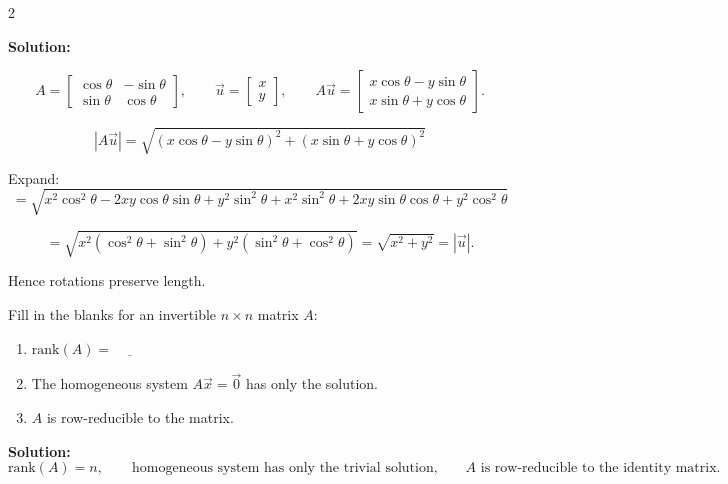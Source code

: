 \documentclass[8pt]{extarticle}
\begin{document}
\begin{multicols}{2}
\begin{tcolorbox}[title=Problem 7 — Original Statement and Solution]
\bigskip
\noindent
\textbf{Solution:}

\[
A =
\begin{bmatrix}
\cos\theta & -\sin\theta\\
\sin\theta & \cos\theta
\end{bmatrix},
\qquad
\vec{u} =
\begin{bmatrix} x\\ y \end{bmatrix},
\qquad
A\vec{u} =
\begin{bmatrix}
x\cos\theta - y\sin\theta\\
x\sin\theta + y\cos\theta
\end{bmatrix}.
\]

\[
|A\vec{u}|
= \sqrt{(x\cos\theta - y\sin\theta)^{2} + (x\sin\theta + y\cos\theta)^{2}}
\]

Expand:
\[
= \sqrt{
x^{2}\cos^{2}\theta - 2xy\cos\theta\sin\theta + y^{2}\sin^{2}\theta
+ x^{2}\sin^{2}\theta + 2xy\sin\theta\cos\theta + y^{2}\cos^{2}\theta
}
\]

\[
= \sqrt{
x^{2}(\cos^{2}\theta+\sin^{2}\theta) + y^{2}(\sin^{2}\theta+\cos^{2}\theta)
}
= \sqrt{x^{2} + y^{2}}
= |\vec{u}|.
\]

Hence rotations preserve length.
\end{tcolorbox}

\begin{tcolorbox}[title=Problem 8 — Original Statement and Solution]
\noindent
Fill in the blanks for an invertible \( n \times n \) matrix \( A \):
\begin{enumerate}
\item[(a)] \(\mathrm{rank}(A) = \underline{\hspace{1cm}}\)
\item[(b)] The homogeneous system \( A\vec{x} = \vec{0} \) has only the \underline{\hspace{2cm}} solution.
\item[(c)] \( A \) is row-reducible to the \underline{\hspace{2cm}} matrix.
\end{enumerate}

\bigskip
\noindent
\textbf{Solution:}
\[
\mathrm{rank}(A) = n, \qquad
\text{homogeneous system has only the trivial solution,} \qquad
A \text{ is row-reducible to the identity matrix.}
\]
\end{tcolorbox}


\end{multicols}
\end{document}
